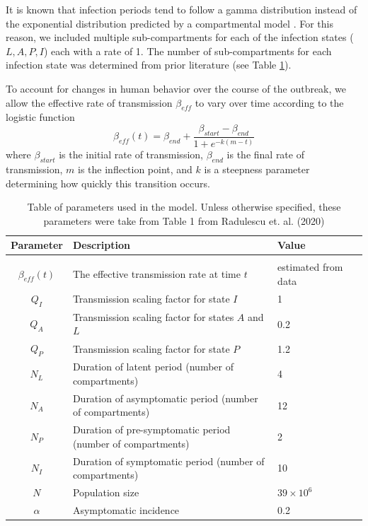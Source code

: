\documentclass[11pt]{article}
\begin{document}
    It is known that infection periods tend to follow a gamma distribution instead of the exponential distribution
    predicted by a compartmental model \cite{brauer_mathematical_2019}. For this reason, we included multiple sub-compartments
    for each of the infection states ($L,A,P,I$) each with a rate of 1. The number of sub-compartments for each infection
    state was determined from prior literature (see Table \ref{parameter_table}).

    To account for changes in human behavior over the course of the outbreak, we allow the effective rate of transmission 
    $\beta_{eff}$ to vary over time according to the logistic function
    $$\beta_{eff}(t) = \beta_{end} + \frac{\beta_{start}-\beta_{end}}{1+e^{-k(m-t)}}$$
    where $\beta_{start}$ is the initial rate of transmission, $\beta_{end}$ is the final rate of transmission, $m$ is
    the inflection point, and $k$ is a steepness parameter determining how quickly this transition occurs.

    \begin{table}
        \begin{tabular}{ c l l l}
            Parameter & Description & Value \\
            \hline \\
            $\beta_{eff}(t)$       & The effective transmission rate at time $t$            & estimated from data \\ 
            $Q_I$                   & Transmission scaling factor for state $I$                     & 1 \\
            $Q_A$                   & Transmission scaling factor for states $A$ and $L$            & 0.2 \\    
            $Q_P$                   & Transmission scaling factor for state $P$                     & 1.2 \\
            $N_L$                   & Duration of latent period (number of compartments)            & 4 \\
            $N_A$                   & Duration of asymptomatic period (number of compartments)      & 12 \\
            $N_P$                   & Duration of pre-symptomatic period (number of compartments)   & 2 \\
            $N_I$                   & Duration of symptomatic period (number of compartments)       & 10 \\
            $N$                     & Population size                                               & $39\times10^6$ \\
            $\alpha$                & Asymptomatic incidence                                        & 0.2 
        \end{tabular}
        \caption{Table of parameters used in the model. Unless otherwise specified, these parameters were take from Table 1
        from Radulescu et. al. (2020)\cite{radulescu_management_2020}}
        \label{parameter_table}
    \end{table}
\end{document}
